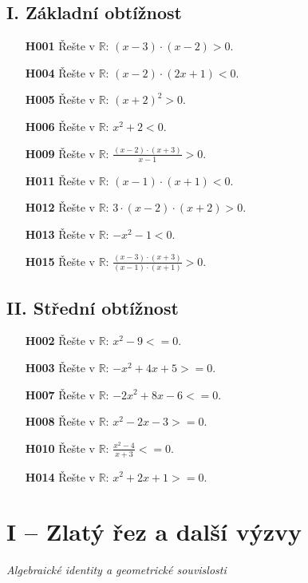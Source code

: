 \documentclass[11pt,a4paper]{article}
\begin{document}
\subsection*{I. Základní obtížnost}
\begin{enumerate}[label={},itemsep=5pt]
\item[\textbf{H001}] Řešte v $\mathbb R$: $\left(x - 3\right) \cdot \left(x - 2\right) > 0$.
\item[\textbf{H004}] Řešte v $\mathbb R$: $\left(x - 2\right) \cdot \left(2x + 1\right) < 0$.
\item[\textbf{H005}] Řešte v $\mathbb R$: $\left(x + 2\right)^{2} > 0$.
\item[\textbf{H006}] Řešte v $\mathbb R$: $x^{2} + 2 < 0$.
\item[\textbf{H009}] Řešte v $\mathbb R$: $\frac{\left(x - 2\right) \cdot \left(x + 3\right)}{x - 1} > 0$.
\item[\textbf{H011}] Řešte v $\mathbb R$: $\left(x - 1\right) \cdot \left(x + 1\right) < 0$.
\item[\textbf{H012}] Řešte v $\mathbb R$: $3 \cdot \left(x - 2\right) \cdot \left(x + 2\right) > 0$.
\item[\textbf{H013}] Řešte v $\mathbb R$: $- x^{2} - 1 < 0$.
\item[\textbf{H015}] Řešte v $\mathbb R$: $\frac{\left(x - 3\right) \cdot \left(x + 3\right)}{\left(x - 1\right) \cdot \left(x + 1\right)} > 0$.
\end{enumerate}
\subsection*{II. Střední obtížnost}
\begin{enumerate}[label={},itemsep=5pt]
\item[\textbf{H002}] Řešte v $\mathbb R$: $x^{2} - 9 <= 0$.
\item[\textbf{H003}] Řešte v $\mathbb R$: $- x^{2} + 4x + 5 >= 0$.
\item[\textbf{H007}] Řešte v $\mathbb R$: $- 2x^{2} + 8x - 6 <= 0$.
\item[\textbf{H008}] Řešte v $\mathbb R$: $x^{2} - 2x - 3 >= 0$.
\item[\textbf{H010}] Řešte v $\mathbb R$: $\frac{x^{2} - 4}{x + 3} <= 0$.
\item[\textbf{H014}] Řešte v $\mathbb R$: $x^{2} + 2x + 1 >= 0$.
\end{enumerate}
\section*{I -- Zlatý řez a další výzvy}
\textit{Algebraické identity a geometrické souvislosti}
\end{document}
